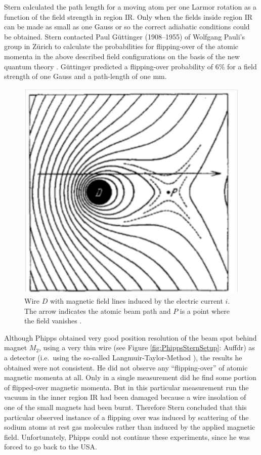 \documentclass[12pt]{article}
\begin{document}
Stern calculated the path length for a moving atom per one Larmor rotation as a function of the field strength in region IR. Only when the fields inside region IR can be made as small as one Gauss or so the correct adiabatic conditions could be obtained. Stern contacted Paul Güttinger (1908--1955) of Wolfgang Pauli's group in Zürich to calculate the probabilities for flipping-over of the atomic momenta in the above described field configurations on the basis of the new quantum theory \citep{GuettingerP1932Verhalten}. Güttinger predicted a flipping-over probability of 6\% for a field strength of one Gauss and a path-length of one mm.
%
\begin{figure}
\begin{center}
\includegraphics[scale=0.4]{figures/FrischSegreField}
\caption{Wire $D$ with magnetic field lines induced by the electric current $i$. The arrow indicates the atomic beam path and $P$ is a point where the field vanishes \cite[p.~611]{FrischOEtal1933Einstellung}.}
\label{fig:FrischSegreField}
\end{center}
\end{figure}

Although Phipps obtained very good position resolution of the beam spot behind magnet $M_2$, using a very thin wire (see Figure \ref{fig:PhippsSternSetup}: Auffdr) as a detector (i.e.\ using the so-called Langmuir-Taylor-Method \citep{LangmuirI1925Effects}), the results he obtained were not consistent. He did not observe any ``flipping-over'' of atomic magnetic momenta at all. Only in a single measurement did he find some portion of flipped-over magnetic momenta. But in this particular measurement run the vacuum in the inner region IR had been damaged because a wire insolation of one of the small magnets had been burnt. Therefore Stern concluded that this particular observed instance of a flipping over was induced by scattering of the sodium atoms at rest gas molecules rather than induced by the applied magnetic field. Unfortunately, Phipps could not continue these experiments, since he was forced to go back to the USA.
\end{document}
